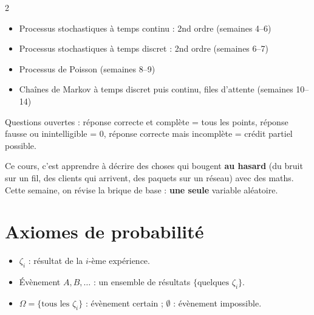 \documentclass[a4paper,9pt]{extarticle}
\begin{document}
\begin{multicols}{2}
\begin{itemize}
\item Processus stochastiques à temps continu : 2nd ordre (semaines 4--6)

\item Processus stochastiques à temps discret : 2nd ordre (semaines 6--7)

\item Processus de Poisson (semaines 8--9)

\item Chaînes de Markov à temps discret puis continu, files d'attente (semaines 10--14)

\end{itemize}


\begin{important}

Questions ouvertes : réponse correcte et complète = tous les points, réponse fausse ou
inintelligible = 0, réponse correcte mais incomplète = crédit partiel possible.

\end{important}


\begin{simple}

Ce cours, c'est apprendre à décrire des choses qui bougent \textbf{au hasard} (du bruit sur un
fil, des clients qui arrivent, des paquets sur un réseau) avec des maths. Cette semaine, on
révise la brique de base : \textbf{une seule} variable aléatoire.

\end{simple}


\section{Axiomes de probabilité}


\begin{definition}

\begin{itemize}

\item $\zeta_i$ : résultat de la $i$-ème expérience.

\item Évènement $A, B, \dots$ : un ensemble de résultats $\{\text{quelques } \zeta_i\}$.

\item $\Omega = \{\text{tous les } \zeta_i\}$ : évènement certain ; $\emptyset$ : évènement
impossible.

\end{itemize}


\end{definition}
\end{multicols}
\end{document}
